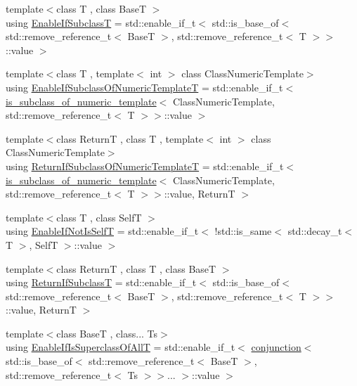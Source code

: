 \begin{DoxyCompactItemize}
\item 
{\footnotesize template$<$class T , class BaseT $>$ }\\using \hyperlink{namespaceprior__hessian_1_1meta_abc650c6661b53cac162bce78cc6c4830}{Enable\+If\+SubclassT} = std\+::enable\+\_\+if\+\_\+t$<$ std\+::is\+\_\+base\+\_\+of$<$ std\+::remove\+\_\+reference\+\_\+t$<$ BaseT $>$, std\+::remove\+\_\+reference\+\_\+t$<$ T $>$$>$\+::value $>$
\item 
{\footnotesize template$<$class T , template$<$ int $>$ class Class\+Numeric\+Template$>$ }\\using \hyperlink{namespaceprior__hessian_1_1meta_a722a7d9905845f2dd08a95b2ddecc10e}{Enable\+If\+Subclass\+Of\+Numeric\+TemplateT} = std\+::enable\+\_\+if\+\_\+t$<$ \hyperlink{classprior__hessian_1_1meta_1_1is__subclass__of__numeric__template}{is\+\_\+subclass\+\_\+of\+\_\+numeric\+\_\+template}$<$ Class\+Numeric\+Template, std\+::remove\+\_\+reference\+\_\+t$<$ T $>$$>$\+::value $>$
\item 
{\footnotesize template$<$class ReturnT , class T , template$<$ int $>$ class Class\+Numeric\+Template$>$ }\\using \hyperlink{namespaceprior__hessian_1_1meta_a05320676e0242ae8def463a1afee362c}{Return\+If\+Subclass\+Of\+Numeric\+TemplateT} = std\+::enable\+\_\+if\+\_\+t$<$ \hyperlink{classprior__hessian_1_1meta_1_1is__subclass__of__numeric__template}{is\+\_\+subclass\+\_\+of\+\_\+numeric\+\_\+template}$<$ Class\+Numeric\+Template, std\+::remove\+\_\+reference\+\_\+t$<$ T $>$$>$\+::value, ReturnT $>$
\item 
{\footnotesize template$<$class T , class SelfT $>$ }\\using \hyperlink{namespaceprior__hessian_1_1meta_ad84d45d1d36f0fbf216f1380d638d22a}{Enable\+If\+Not\+Is\+SelfT} = std\+::enable\+\_\+if\+\_\+t$<$ !std\+::is\+\_\+same$<$ std\+::decay\+\_\+t$<$ T $>$, SelfT $>$\+::value $>$
\item 
{\footnotesize template$<$class ReturnT , class T , class BaseT $>$ }\\using \hyperlink{namespaceprior__hessian_1_1meta_a955cdfa0e628ca7f179af6ab70e87cdd}{Return\+If\+SubclassT} = std\+::enable\+\_\+if\+\_\+t$<$ std\+::is\+\_\+base\+\_\+of$<$ std\+::remove\+\_\+reference\+\_\+t$<$ BaseT $>$, std\+::remove\+\_\+reference\+\_\+t$<$ T $>$$>$\+::value, ReturnT $>$
\item 
{\footnotesize template$<$class BaseT , class... Ts$>$ }\\using \hyperlink{namespaceprior__hessian_1_1meta_a0413ae4eb881eabac578a1283fbff570}{Enable\+If\+Is\+Superclass\+Of\+AllT} = std\+::enable\+\_\+if\+\_\+t$<$ \hyperlink{structprior__hessian_1_1meta_1_1conjunction}{conjunction}$<$ std\+::is\+\_\+base\+\_\+of$<$ std\+::remove\+\_\+reference\+\_\+t$<$ BaseT $>$, std\+::remove\+\_\+reference\+\_\+t$<$ Ts $>$$>$... $>$\+::value $>$
$$
\end{DoxyCompactItemize}
